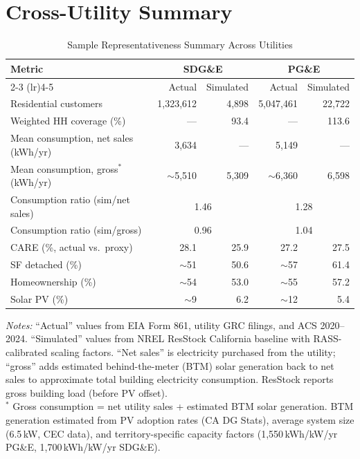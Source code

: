 \documentclass[12pt]{article}
\begin{document}
\clearpage

\section{Cross-Utility Summary}

\begin{table}[htbp]
\centering
\caption{Sample Representativeness Summary Across Utilities}
\label{tab:cross_utility}
\begin{tabular}{lrrrr}
\toprule
\textbf{Metric} & \multicolumn{2}{c}{\textbf{SDG\&E}} & \multicolumn{2}{c}{\textbf{PG\&E}} \\
\cmidrule(lr){2-3} \cmidrule(lr){4-5}
 & Actual & Simulated & Actual & Simulated \\
\midrule
Residential customers & 1,323,612 & 4,898 & 5,047,461 & 22,722 \\
Weighted HH coverage (\%) & --- & 93.4 & --- & 113.6 \\
Mean consumption, net sales (kWh/yr) & 3,634 & --- & 5,149 & --- \\
Mean consumption, gross$^*$ (kWh/yr) & $\sim$5,510 & 5,309 & $\sim$6,360 & 6,598 \\
Consumption ratio (sim/net sales) & \multicolumn{2}{c}{1.46} & \multicolumn{2}{c}{1.28} \\
Consumption ratio (sim/gross) & \multicolumn{2}{c}{0.96} & \multicolumn{2}{c}{1.04} \\
CARE (\%, actual vs.\ proxy) & 28.1 & 25.9 & 27.2 & 27.5 \\
SF detached (\%) & $\sim$51 & 50.6 & $\sim$57 & 61.4 \\
Homeownership (\%) & $\sim$54 & 53.0 & $\sim$55 & 57.2 \\
Solar PV (\%) & $\sim$9 & 6.2 & $\sim$12 & 5.4 \\
\bottomrule
\end{tabular}
\begin{minipage}{\textwidth}
\vspace{0.3em}
\footnotesize
\textit{Notes:} ``Actual'' values from EIA Form 861, utility GRC filings, and ACS 2020--2024. ``Simulated'' values from NREL ResStock California baseline with RASS-calibrated scaling factors. ``Net sales'' is electricity purchased from the utility; ``gross'' adds estimated behind-the-meter (BTM) solar generation back to net sales to approximate total building electricity consumption. ResStock reports gross building load (before PV offset). \\
$^*$ Gross consumption = net utility sales + estimated BTM solar generation. BTM generation estimated from PV adoption rates (CA DG Stats), average system size (6.5\,kW, CEC data), and territory-specific capacity factors (1,550\,kWh/kW/yr PG\&E, 1,700\,kWh/kW/yr SDG\&E).
\end{minipage}
\end{table}
\end{document}
